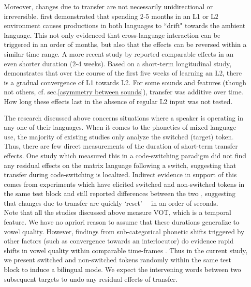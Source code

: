 \documentclass[12 pt]{article}
\begin{document}
Moreover, changes due to transfer are not necessarily unidirectional or irreversible. \cite[][VOT]{sancier1997gestural} first demonstrated that spending 2-5 months in an L1 or L2 environment causes productions in both languages to ``drift" towards the ambient language. This not only evidenced that cross-language interaction can be triggered in an order of months, but also that the effects can be reversed within a similar time range. A more recent study by \cite[][VOT]{tobin2017phonetic} reported comparable effects in an even shorter duration (2-4 weeks). Based on a short-term longitudinal study, \cite[][VOT]{chang2012rapid} demonstrates that over the course of the first five weeks of learning an L2, there is a gradual convergence of L1 towards L2. For some sounds and features (though not others, cf. sec.\ref{asymmetry between sounds}), transfer was additive over time. How long these effects last in the absence of regular L2 input was not tested. 

The research discussed above concerns situations where a speaker is operating in any one of their languages. When it comes to the phonetics of mixed-language use, the majority of existing studies only analyze the switched (target) token. Thus, there are few direct measurements of the duration of short-term transfer effects. One study which measured this in a code-switching paradigm \citep[][VOT]{bullock2009trying} did not find any residual effects on the matrix language following a switch, suggesting that transfer during code-switching is localized. Indirect evidence in support of this comes from experiments which have elicited switched and non-switched tokens in the same test block and still reported differences between the two \citep[e.g.][VOT]{tsui2019impact,olson2013bilingual}, suggesting that changes due to transfer are quickly `reset'--- in an order of seconds.\\
Note that all the studies discussed above measure VOT, which is a temporal feature. We have no apriori reason to assume that these durations generalize to vowel quality. However, findings from sub-categorical phonetic shifts triggered by other factors (such as convergence towards an interlocutor) do evidence rapid shifts in vowel quality within comparable time-frames \citep[e.g.][]{pardo2010expressing,babel2010dialect,babel2012evidence}. Thus in the current study, we present switched and non-switched tokens randomly within the same test block to induce a bilingual mode. We expect the intervening words between two subsequent targets to undo any residual effects of transfer.
\end{document}
